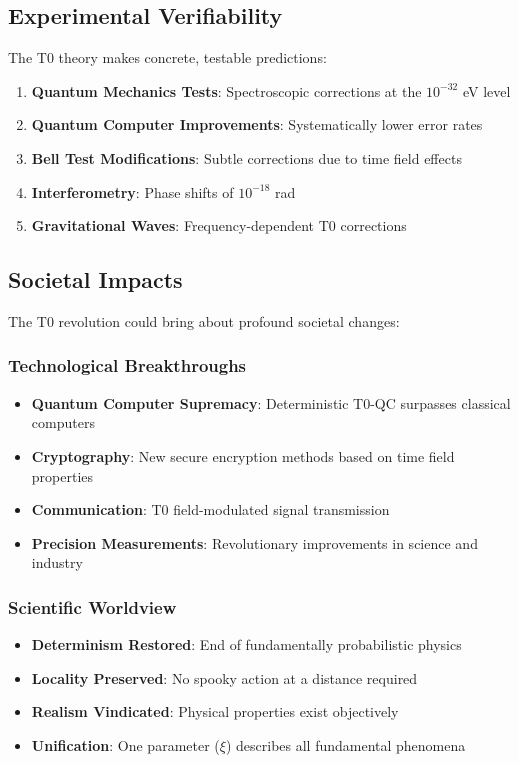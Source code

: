 \documentclass[12pt,a4paper]{article}
\begin{document}
	\subsection{Experimental Verifiability}
	
	The T0 theory makes concrete, testable predictions:
	
	\begin{enumerate}
		\item \textbf{Quantum Mechanics Tests}: Spectroscopic corrections at the $10^{-32}$ eV level
		\item \textbf{Quantum Computer Improvements}: Systematically lower error rates
		\item \textbf{Bell Test Modifications}: Subtle corrections due to time field effects
		\item \textbf{Interferometry}: Phase shifts of $10^{-18}$ rad
		\item \textbf{Gravitational Waves}: Frequency-dependent T0 corrections
	\end{enumerate}
	
	\subsection{Societal Impacts}
	
	The T0 revolution could bring about profound societal changes:
	
	\subsubsection{Technological Breakthroughs}
	
	\begin{itemize}
		\item \textbf{Quantum Computer Supremacy}: Deterministic T0-QC surpasses classical computers
		\item \textbf{Cryptography}: New secure encryption methods based on time field properties
		\item \textbf{Communication}: T0 field-modulated signal transmission
		\item \textbf{Precision Measurements}: Revolutionary improvements in science and industry
	\end{itemize}
	
	\subsubsection{Scientific Worldview}
	
	\begin{itemize}
		\item \textbf{Determinism Restored}: End of fundamentally probabilistic physics
		\item \textbf{Locality Preserved}: No spooky action at a distance required
		\item \textbf{Realism Vindicated}: Physical properties exist objectively
		\item \textbf{Unification}: One parameter ($\xi$) describes all fundamental phenomena
	\end{itemize}
	
\end{document}
